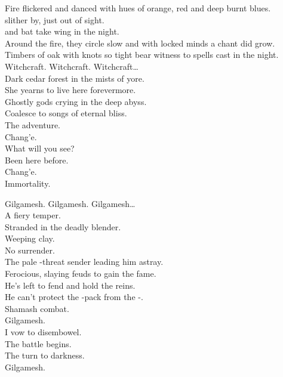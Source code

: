 
Fire flickered and danced with hues of orange, red and deep burnt blues. \\
 slither by, just out of sight. \\
 and bat take wing in the night. \\
Around the fire, they circle slow and with locked minds a chant did grow. \\
Timbers of oak with knots so tight bear witness to spells cast in the night. \\

Witchcraft. Witchcraft. Witchcraft… \\

Dark cedar forest in the mists of yore. \\
She yearns to live here forevermore. \\
Ghostly gods crying in the deep abyss. \\
Coalesce to songs of eternal bliss. \\

The adventure. \\
Chang'e. \\
What will you see? \\
Been here before. \\
Chang'e. \\
Immortality. \\



Gilgamesh. Gilgamesh. Gilgamesh… \\

A fiery temper. \\
Stranded in the deadly blender. \\
Weeping  clay. \\
No surrender. \\
The pale -threat sender leading him astray. \\
Ferocious, slaying feuds to gain the fame. \\
He's left to fend and hold the reins. \\
He can't protect the -pack from the -. \\
Shamash combat. \\

Gilgamesh. \\
I vow to disembowel. \\
The battle begins. \\
The  turn to darkness. \\
Gilgamesh. \\

